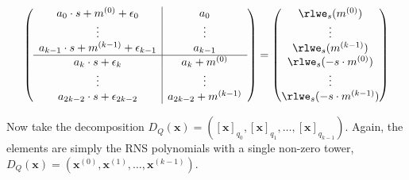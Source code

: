     \begin{gather*}
        \left(
        \begin{array}{c|c}
            a_0\cdot s + m^{(0)} + \epsilon_0 & a_0 \\
            \vdots & \vdots \\
            a_{k-1}\cdot s + m^{(k-1)} + \epsilon_{k-1} & a_{k-1} \\
            \hline
            a_k\cdot s + \epsilon_k & a_k + m^{(0)} \\
            \vdots & \vdots \\
            a_{2k-2}\cdot s + \epsilon_{2k-2} & a_{2k-2} + m^{(k-1)} \\
        \end{array}
        \right)
        =
        \begin{pmatrix}
            \rlwe_s(m^{(0)}) \\
            \vdots \\
            \rlwe_s(m^{(k-1)}) \\
            \rlwe_s(-s\cdot m^{(0)}) \\
            \vdots \\
            \rlwe_s(-s\cdot m^{(k-1)})
        \end{pmatrix}
    \end{gather*}
    
    Now take the decomposition $D_Q(\mathbf{x}) = ([\mathbf{x}]_{q_0}, [\mathbf{x}]_{q_1}, \dots, [\mathbf{x}]_{q_{k-1}})$. Again, the elements are simply the RNS polynomials with a single non-zero tower, $D_Q(\mathbf{x}) = (\mathbf{x}^{(0)}, \mathbf{x}^{(1)}, \dots, \mathbf{x}^{(k-1)})$. %
    
    
